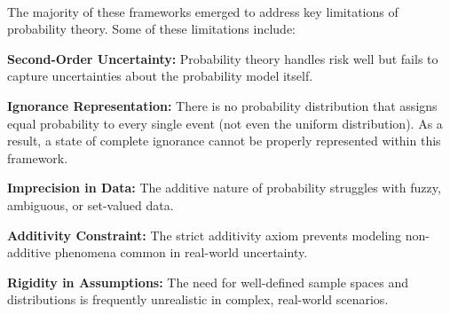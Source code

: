 \hspace{1cm}\cite{uncertaintymeasuresbigpicture}\\

The majority of these frameworks emerged to address key limitations of probability theory. Some of these limitations include:
\begin{romanenum}
      \item \textbf{Second-Order Uncertainty:} Probability theory handles risk well but fails to capture uncertainties about the probability model itself.
      \item \textbf{Ignorance Representation:} There is no probability distribution that assigns equal probability to every single event (not even the uniform distribution). As a result, a state of complete ignorance cannot be properly represented within this framework.
      \item \textbf{Imprecision in Data:} The additive nature of probability struggles with fuzzy, ambiguous, or set-valued data.
      \item \textbf{Additivity Constraint:} The strict additivity axiom prevents modeling non-additive phenomena common in real-world uncertainty.
      \item \textbf{Rigidity in Assumptions:} The need for well-defined sample spaces and distributions is frequently unrealistic in complex, real-world scenarios.
    \end{romanenum}
    




